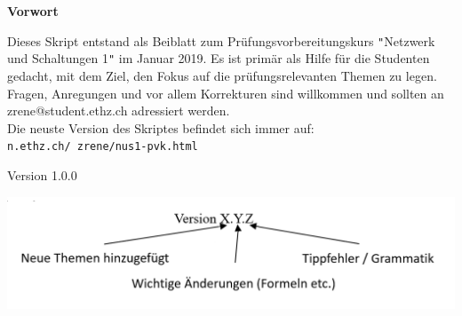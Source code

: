






 \begin{center}
 	\LARGE\textbf{Vorwort}
 \end{center}
 Dieses Skript entstand als Beiblatt zum Prüfungsvorbereitungskurs \texttt{"}Netzwerk und Schaltungen 1\texttt{"} im Januar 2019.
Es ist primär als Hilfe für die Studenten gedacht, mit dem Ziel, den Fokus auf die prüfungsrelevanten Themen zu legen.
	Fragen, Anregungen und vor allem Korrekturen sind willkommen und sollten an zrene@student.ethz.ch adressiert werden. \\
Die neuste Version des Skriptes befindet sich immer auf: \texttt{n.ethz.ch/~zrene/nus1-pvk.html}
\\
\begin{center}
	Version 1.0.0
\end{center}
\begin{center}
	\hspace{1cm}
	\includegraphics[scale=0.48]{img/version.png}
\end{center}


\cleardoublepage
{}

\tableofcontents                %

\newpage


